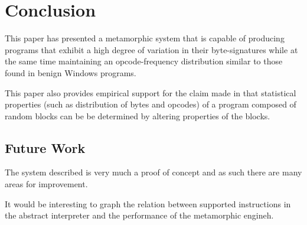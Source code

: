 \chapter{Conclusion}
    
    This paper has presented a metamorphic system that is capable of producing
    programs that exhibit a high degree of variation in their byte-signatures
    while at the same time maintaining an opcode-frequency distribution similar
    to those found in benign Windows programs.

    This paper also provides empirical support for the claim made in
    \cite{franken} that statistical properties (such as distribution of bytes
    and opcodes) of a program composed of random blocks can be be determined by
    altering properties of the blocks.

    \section{Future Work}

    The system described is very much a proof of concept and as such there are
    many areas for improvement.

    It would be interesting to graph the relation between supported instructions
    in the abstract interpreter and the performance of the metamorphic engineh.
